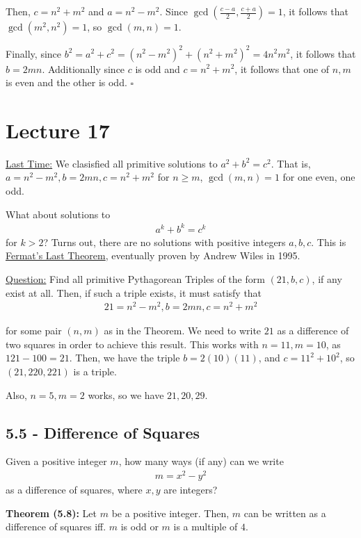 \documentclass{article}
\newcommand*{\qed}{\hfill$\square$}%
\begin{document}
Then, $c=n^2+m^2$ and $a=n^2-m^2$. Since $\gcd(\frac{c-a}{2}, \frac{c+a}{2})=1$, it follows that $\gcd(m^2,n^2)=1$, so $\gcd(m,n)=1$. 

Finally, since $b^2=a^2+c^2=(n^2-m^2)^2+(n^2+m^2)^2=4n^2m^2$, it follows that $b=2mn$. Additionally since $c$ is odd and $c=n^2+m^2$, it follows that one of $n,m$ is even and the other is odd. \qed

\section{Lecture 17}

\underline{Last Time:} We clasisfied all primitive solutions to $a^2+b^2=c^2$. That is, $a=n^2-m^2, b=2mn, c=n^2+m^2$ for $n\geq m$, $\gcd(m,n)=1$ for one even, one odd. 

What about solutions to \begin{align*}
    a^k+b^k=c^k
\end{align*}for $k>2$? Turns out, there are no solutions with positive integers $a,b,c$. This is \underline{Fermat's Last Theorem}, eventually proven by Andrew Wiles in 1995. 

\underline{Question:} Find all primitive Pythagorean Triples of the form $(21,b,c)$, if any exist at all. Then, if such a triple exists, it must satisfy that \begin{align*}
	21=n^2-m^2, b=2mn, c=n^2+m^2
\end{align*}

for some pair $(n,m)$ as in the Theorem. We need to write $21$ as a difference of two squares in order to achieve this result. This works with $n=11, m=10$, as $121-100=21$. Then, we have the triple $b=2(10)(11)$, and $c=11^2+10^2$, so $(21,220, 221)$ is a triple. 

Also, $n=5,m=2$ works, so we have $21, 20, 29$. 

\subsection{5.5 - Difference of Squares}

Given a positive integer $m$, how many ways (if any) can we write \begin{align*}
	m=x^2-y^2
\end{align*} as a difference of squares, where $x,y$ are integers?

\textbf{Theorem (5.8):} Let $m$ be a positive integer. Then, $m$ can be written as a difference of squares iff. $m$ is odd or $m$ is a multiple of $4$.
\end{document}
